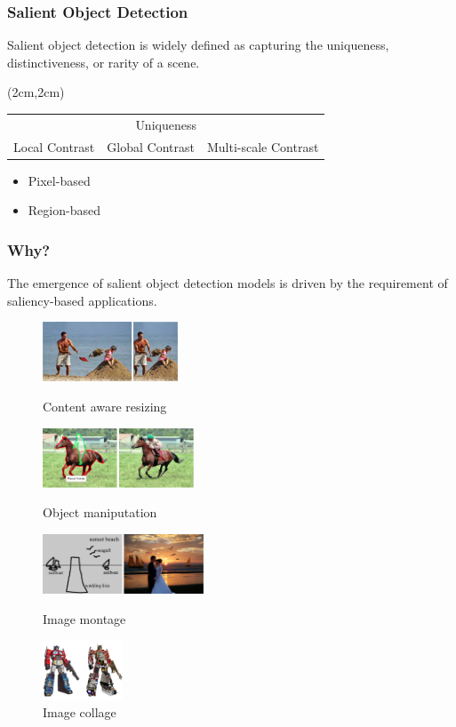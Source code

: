 \documentclass[notheorems,serif,table,compress]{beamer}  %
\begin{document}
\begin{frame}
\frametitle{Salient Object Detection}
Salient object detection is widely defined as capturing the uniqueness, distinctiveness, or rarity of a scene.

\begin{textblock*}{10cm}(2cm,2cm)
\begin{tabular}{ccc}
\multicolumn{3}{c}{Uniqueness}\\
Local Contrast & Global Contrast & Multi-scale Contrast 
\end{tabular}
\end{textblock*}

\begin{itemize}
\item Pixel-based 
\item Region-based
\end{itemize}
\end{frame}


\begin{frame}
\frametitle{Why? }
The emergence of salient object detection models is driven by the requirement of saliency-based applications.
\begin{figure}[!ht]
  \begin{minipage}[t]{0.4\textwidth}
  \includegraphics[height=0.7in]{resizing}
  \caption{Content aware resizing}
  \end{minipage}
  \begin{minipage}[t]{0.4\textwidth}
  \includegraphics[height=0.7in]{manipulation}
  \caption{Object maniputation}
  \end{minipage}

\hspace{0.28in}
  \begin{minipage}[t]{0.4\textwidth}
  \includegraphics[height=0.7in]{sketch2photo}
  \caption{Image montage}
  \end{minipage}
  \begin{minipage}[t]{0.4\textwidth}
  \hspace{0.35in}
  \includegraphics[height=0.7in]{collage.jpg}
  \caption{Image collage}
  \end{minipage}
\end{figure} 
\end{frame}
\end{document}
